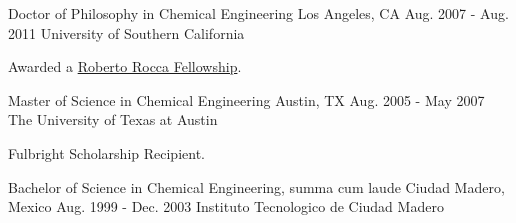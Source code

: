 

\begin{cventries}

  \cventry
    {Doctor of Philosophy in Chemical Engineering} %
    {Los Angeles, CA} %
    {Aug. 2007 - Aug. 2011} %
    {University of Southern California} %
    {
      \begin{cvitems} %
        \item  Awarded a {\href{http://www.robertorocca.org/en/fellowships/fellows07.aspx}{Roberto Rocca Fellowship}}.
      \end{cvitems}
    }

  \cventry
      {Master of Science in Chemical Engineering} %
      {Austin, TX} %
      {Aug. 2005 - May 2007} %
      {The University of Texas at Austin} %
      {
        \begin{cvitems} %
          \item Fulbright Scholarship Recipient.
        \end{cvitems}
      }

  \cventry
      {Bachelor of Science in Chemical Engineering, summa cum laude} %
      {Ciudad Madero, Mexico} %
      {Aug. 1999 - Dec. 2003} %
      {Instituto Tecnologico de Ciudad Madero} %
      {}




\end{cventries}
